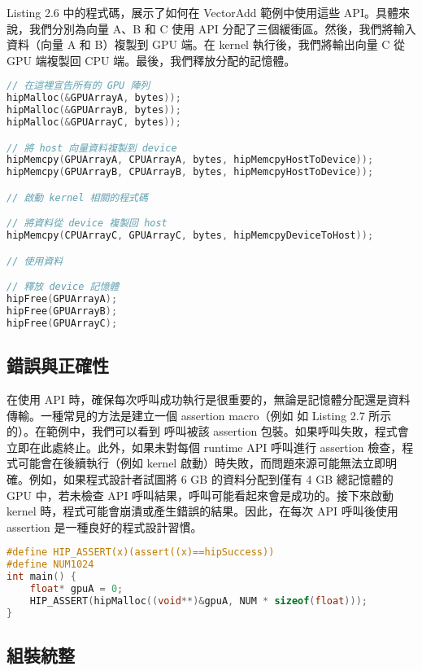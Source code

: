 Listing 2.6 中的程式碼，展示了如何在 VectorAdd 範例中使用這些  API。具體來說，我們分別為向量 A、B 和 C 使用  API 分配了三個緩衝區。然後，我們將輸入資料（向量 A 和 B）複製到 GPU 端。在 kernel 執行後，我們將輸出向量 C 從 GPU 端複製回 CPU 端。最後，我們釋放分配的記憶體。

\begin{lstlisting}[language=C, caption={VectorAdd 範例中的 GPU 資料管理}, label={6th:example}]
// 在這裡宣告所有的 GPU 陣列
hipMalloc(&GPUArrayA, bytes));
hipMalloc(&GPUArrayB, bytes));
hipMalloc(&GPUArrayC, bytes));

// 將 host 向量資料複製到 device
hipMemcpy(GPUArrayA, CPUArrayA, bytes, hipMemcpyHostToDevice));
hipMemcpy(GPUArrayB, CPUArrayB, bytes, hipMemcpyHostToDevice));

// 啟動 kernel 相關的程式碼

// 將資料從 device 複製回 host
hipMemcpy(CPUArrayC, GPUArrayC, bytes, hipMemcpyDeviceToHost));

// 使用資料

// 釋放 device 記憶體
hipFree(GPUArrayA);
hipFree(GPUArrayB);
hipFree(GPUArrayC);
\end{lstlisting}

\subsection{錯誤與正確性}
在使用  API 時，確保每次呼叫成功執行是很重要的，無論是記憶體分配還是資料傳輸。一種常見的方法是建立一個 assertion macro（例如 如 Listing 2.7 所示的）。在範例中，我們可以看到  呼叫被該 assertion 包裝。如果呼叫失敗，程式會立即在此處終止。此外，如果未對每個 runtime API 呼叫進行 assertion 檢查，程式可能會在後續執行（例如 kernel 啟動）時失敗，而問題來源可能無法立即明確。例如，如果程式設計者試圖將 6 GB 的資料分配到僅有 4 GB 總記憶體的 GPU 中，若未檢查 API 呼叫結果，呼叫可能看起來會是成功的。接下來啟動 kernel 時，程式可能會崩潰或產生錯誤的結果。因此，在每次 API 呼叫後使用 assertion 是一種良好的程式設計習慣。

\begin{lstlisting}[language=C, caption={\term{HIP} 錯誤檢查範例}, label={7th:example}]
#define HIP_ASSERT(x)(assert((x)==hipSuccess))
#define NUM1024
int main() {
    float* gpuA = 0;
    HIP_ASSERT(hipMalloc((void**)&gpuA, NUM * sizeof(float)));
}
\end{lstlisting}

\subsection{組裝統整}

